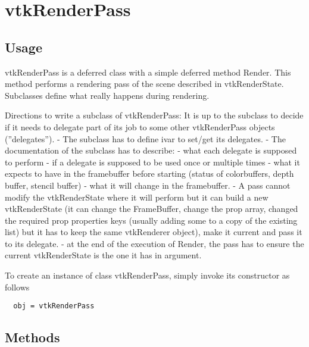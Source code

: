 \section{vtkRenderPass}

\subsection{Usage}

 vtkRenderPass is a deferred class with a simple deferred method Render.
 This method performs a rendering pass of the scene described in
 vtkRenderState.
 Subclasses define what really happens during rendering.

 Directions to write a subclass of vtkRenderPass:
 It is up to the subclass to decide if it needs to delegate part of its job
 to some other vtkRenderPass objects (''delegates'').
 - The subclass has to define ivar to set/get its delegates.
 - The documentation of the subclass has to describe:
  - what each delegate is supposed to perform
  - if a delegate is supposed to be used once or multiple times 
  - what it expects to have in the framebuffer before starting (status
 of colorbuffers, depth buffer, stencil buffer)
  - what it will change in the framebuffer.
 - A pass cannot modify the vtkRenderState where it will perform but
 it can build a new vtkRenderState (it can change the FrameBuffer, change the
 prop array, changed the required prop properties keys (usually adding some
 to a copy of the existing list) but it has to keep the same vtkRenderer
 object), make it current and pass it to its delegate.
 - at the end of the execution of Render, the pass has to ensure the
 current vtkRenderState is the one it has in argument.

To create an instance of class vtkRenderPass, simply
invoke its constructor as follows
\begin{verbatim}
  obj = vtkRenderPass
\end{verbatim}
\subsection{Methods}

